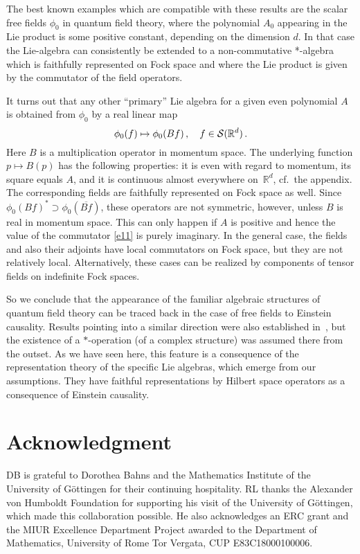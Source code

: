 \documentclass[11pt]{article}
\def\RR{\mathbb{R}}
\def\cS{{\cal S}}
\def\be{\begin{equation}}
\def\ee{\end{equation}}
\begin{document}
\medskip 
The best known examples which are compatible with these results are
the scalar free fields $\phi_0$ in quantum field theory, where the
polynomial $A_0$ appearing in the Lie product is some positive constant,
depending on the dimension $d$. In that case the Lie-algebra 
can consistently be extended to a non-commutative *-algebra
which is faithfully represented on Fock space and where the
Lie product is given by the commutator of the field operators. 

\medskip 
It turns out that any 
other ``primary'' Lie algebra for a given
even polynomial $A$ is obtained from $\phi_0$ by a real linear map 
\be
\phi_0(f) \mapsto \phi_0(B f) \, , \quad f \in \cS(\RR^d) \, .
\ee
Here $B$ is a 
multiplication operator in momentum space.
The underlying function $p \mapsto B(p)$
has the following properties: it is 
even with regard to momentum, its square equals $A$, 
and it is continuous almost
everywhere on~$\RR^d$, cf.\ the appendix. The corresponding fields are 
faithfully represented on Fock space as well.
Since $\phi_0(B f)^* \supset \phi_0(\overline{B f})$, 
these operators are not symmetric, however,
unless $B$ is real in momentum space. This can only happen 
if $A$ is positive and hence the value of the commutator 
\eqref{e11} is purely imaginary. In the general case, the fields and
also their adjoints have local commutators on Fock space, but
they are not relatively local. Alternatively, these cases
can be realized by components of tensor fields on indefinite
Fock spaces. 

\medskip
So we conclude that the appearance of the familiar algebraic 
structures of quantum field theory 
can be traced back in the case of free fields to
Einstein causality. Results pointing into a similar direction 
were also established in~\cite{BuFr}, but the existence of a
$*$-operation (of a complex structure)
was assumed there from the outset. As we have
seen here, this feature is a consequence of the representation
theory of the specific Lie algebras, which emerge from our 
assumptions. They have faithful representations by Hilbert space 
operators as a consequence of Einstein causality. 


\section*{Acknowledgment}
\noindent DB  is grateful
to Dorothea Bahns and the Mathematics Institute
of the University of G\"ottingen for their continuing hospitality. 
RL thanks the Alexander von Humboldt Foundation for
supporting his visit of the University of G\"ottingen,
which made this collaboration possible. He also acknowledges an ERC
grant and the MIUR Excellence Department Project awarded to the
Department of Mathematics, University of
Rome Tor Vergata, CUP E83C18000100006.
\end{document}
